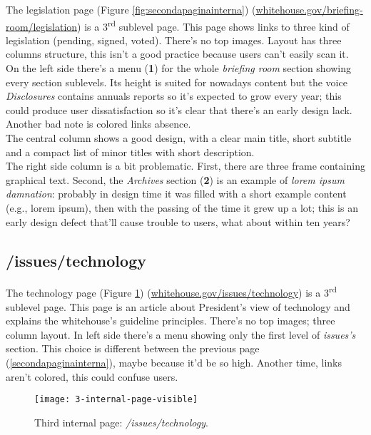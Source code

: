 \documentclass[
10pt, %
a4paper, %
oneside, %
headinclude,footinclude, %
BCOR5mm, %
]{scrartcl}
\begin{document}
	
	The legislation page (Figure \ref{fig:secondapaginainterna}) (\href{http://www.whitehouse.gov/briefing-room/legislation}{whitehouse.gov/briefing-room/legislation}) is a 3\textsuperscript{rd} sublevel page. This page shows links to three kind of legislation (pending, signed, voted). There's no top images. Layout has three columns structure, this isn't a good practice because users can't easily scan it. On the left side there's a menu (\textbf{1}) for the whole \emph{briefing room} section showing every section sublevels. Its height is suited for nowadays content but the voice \emph{Disclosures} contains annuals reports so it's expected to grow every year; this could produce user dissatisfaction so it's clear that there's an early design lack. Another bad note is colored links absence. \\
	The central column shows a good design, with a clear main title, short subtitle and a compact list of minor titles with short description. \\
	The right side column is a bit problematic. First, there are three frame containing graphical text. Second, the \emph{Archives} section (\textbf{2}) is an example of \emph{lorem ipsum damnation}: probably in design time it was filled with a short example content (e.g., lorem ipsum), then with the passing of the time it grew up a lot; this is an early design defect that'll cause trouble to users, what about within ten years?
	

	\subsection{/issues/technology}
	\label{terzapaginainterna} 

	
	The technology page (Figure \ref{fig:terzapaginainterna}) (\href{http://www.whitehouse.gov/issues/technology}{whitehouse.gov/issues/technology}) is a 3\textsuperscript{rd} sublevel page. This page is an article about President's view of technology and explains the whitehouse's guideline principles. There's no top images; three column layout. In left side there's a menu showing only the first level of \emph{issues's} section. This choice is different between the previous page (\ref{secondapaginainterna}), maybe because it'd be so high. Another time, links aren't colored, this could confuse users. \\

	\begin{figure}[h!]
	\centering 
	\centerline{\texttt{[image: 3-internal-page-visible]}}
	\caption[Third internal page: /issues/technology]{Third internal page: \emph{/issues/technology}.}
	\label{fig:terzapaginainterna} 
	\end{figure}
\end{document}
